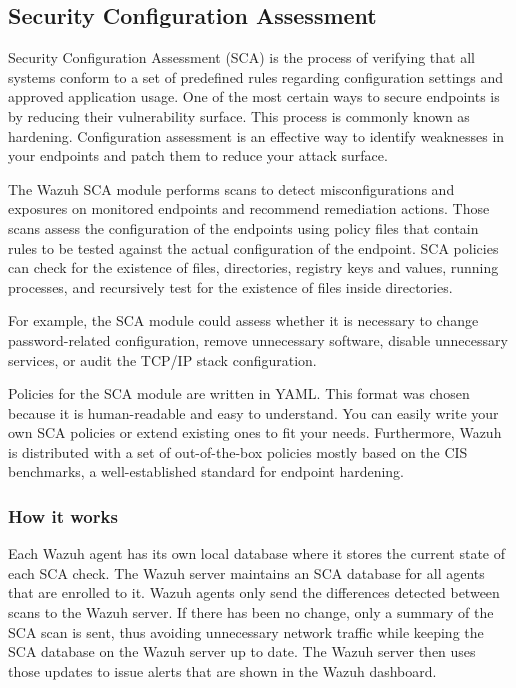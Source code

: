 \subsection{Security Configuration Assessment}
Security Configuration Assessment (SCA) is the process of verifying that all systems conform to a set of predefined rules regarding configuration settings and approved application usage. One of the most certain ways to secure endpoints is by reducing their vulnerability surface. This process is commonly known as hardening. Configuration assessment is an effective way to identify weaknesses in your endpoints and patch them to reduce your attack surface.

The Wazuh SCA module performs scans to detect misconfigurations and exposures on monitored endpoints and recommend remediation actions. Those scans assess the configuration of the endpoints using policy files that contain rules to be tested against the actual configuration of the endpoint. SCA policies can check for the existence of files, directories, registry keys and values, running processes, and recursively test for the existence of files inside directories.

For example, the SCA module could assess whether it is necessary to change password-related configuration, remove unnecessary software, disable unnecessary services, or audit the TCP/IP stack configuration.

Policies for the SCA module are written in YAML. This format was chosen because it is human-readable and easy to understand. You can easily write your own SCA policies or extend existing ones to fit your needs. Furthermore, Wazuh is distributed with a set of out-of-the-box policies mostly based on the CIS benchmarks, a well-established standard for endpoint hardening.

\subsubsection{How it works}
Each Wazuh agent has its own local database where it stores the current state of each SCA check. The Wazuh server maintains an SCA database for all agents that are enrolled to it. Wazuh agents only send the differences detected between scans to the Wazuh server. If there has been no change, only a summary of the SCA scan is sent, thus avoiding unnecessary network traffic while keeping the SCA database on the Wazuh server up to date. The Wazuh server then uses those updates to issue alerts that are shown in the Wazuh dashboard.

